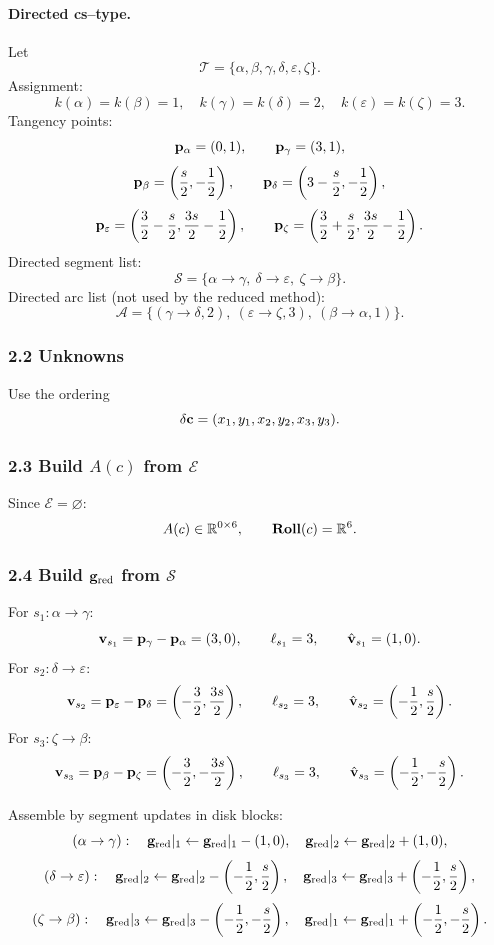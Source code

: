 \documentclass[12pt,letterpaper]{amsart}
\theoremstyle{definition}
\theoremstyle{remark}
\newcommand{\Roll}{\text{\rm \bf Roll}}
\newcommand{\R}{{\mathbb{R}}}
\begin{document}
\paragraph{Directed cs--type.}
Let
\[
\mathcal T=\{\alpha,\beta,\gamma,\delta,\varepsilon,\zeta\}.
\]
Assignment:
\[
k(\alpha)=k(\beta)=1,\quad k(\gamma)=k(\delta)=2,\quad k(\varepsilon)=k(\zeta)=3.
\]
Tangency points:
\[
{\bf p}_\alpha=(0,1),\qquad {\bf p}_\gamma=(3,1),
\]
\[
{\bf p}_\beta=\left(\frac{s}{2},-\frac12\right),\qquad
{\bf p}_\delta=\left(3-\frac{s}{2},-\frac12\right),
\]
\[
{\bf p}_\varepsilon=\left(\frac32-\frac{s}{2},\frac{3s}{2}-\frac12\right),\qquad
{\bf p}_\zeta=\left(\frac32+\frac{s}{2},\frac{3s}{2}-\frac12\right).
\]
Directed segment list:
\[
\mathcal S=\{\alpha\to\gamma,\ \delta\to\varepsilon,\ \zeta\to\beta\}.
\]
Directed arc list (not used by the reduced method):
\[
\mathcal A=\{(\gamma\to\delta,2),\ (\varepsilon\to\zeta,3),\ (\beta\to\alpha,1)\}.
\]

\subsubsection*{2.2 Unknowns}

Use the ordering
\[
\delta{\bf c}=(x_1,y_1,x_2,y_2,x_3,y_3).
\]

\subsubsection*{2.3 Build $A(c)$ from $\mathcal E$}

Since $\mathcal E=\varnothing$:
\[
A(c)\in\R^{0\times 6},
\qquad
\Roll(c)=\R^{6}.
\]

\subsubsection*{2.4 Build ${\bf g}_{\rm red}$ from $\mathcal S$}

For $s_1:\alpha\to\gamma$:
\[
{\bf v}_{s_1}={\bf p}_\gamma-{\bf p}_\alpha=(3,0),\qquad
\ell_{s_1}=3,\qquad
\hat{\bf v}_{s_1}=(1,0).
\]
For $s_2:\delta\to\varepsilon$:
\[
{\bf v}_{s_2}={\bf p}_\varepsilon-{\bf p}_\delta=\left(-\frac32,\frac{3s}{2}\right),\qquad
\ell_{s_2}=3,\qquad
\hat{\bf v}_{s_2}=\left(-\frac12,\frac{s}{2}\right).
\]
For $s_3:\zeta\to\beta$:
\[
{\bf v}_{s_3}={\bf p}_\beta-{\bf p}_\zeta=\left(-\frac32,-\frac{3s}{2}\right),\qquad
\ell_{s_3}=3,\qquad
\hat{\bf v}_{s_3}=\left(-\frac12,-\frac{s}{2}\right).
\]

Assemble by segment updates in disk blocks:
\[
(\alpha\to\gamma):\quad {\bf g}_{\rm red}|_1\gets {\bf g}_{\rm red}|_1-(1,0),\quad {\bf g}_{\rm red}|_2\gets {\bf g}_{\rm red}|_2+(1,0),
\]
\[
(\delta\to\varepsilon):\quad {\bf g}_{\rm red}|_2\gets {\bf g}_{\rm red}|_2-\left(-\frac12,\frac{s}{2}\right),\quad
{\bf g}_{\rm red}|_3\gets {\bf g}_{\rm red}|_3+\left(-\frac12,\frac{s}{2}\right),
\]
\[
(\zeta\to\beta):\quad {\bf g}_{\rm red}|_3\gets {\bf g}_{\rm red}|_3-\left(-\frac12,-\frac{s}{2}\right),\quad
{\bf g}_{\rm red}|_1\gets {\bf g}_{\rm red}|_1+\left(-\frac12,-\frac{s}{2}\right).
\]
\end{document}
